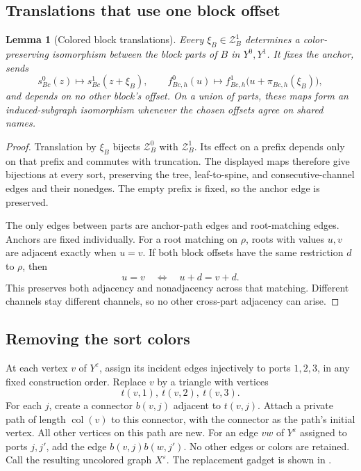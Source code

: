 \documentclass[11pt]{article}
\newtheorem{lemma}[theorem]{Lemma}
\theoremstyle{definition}
\begin{document}
\subsection{Translations that use one block offset}

\begin{lemma}[Colored block translations]
\label{graph:colored-translations}
Every \(\xi_B\in\mathcal Z_B^1\) determines a color-preserving isomorphism
between the block parts of \(B\) in \(Y^0,Y^1\).
It fixes the anchor, sends
\[
 s_{Bc}^0(z)\longmapsto s_{Bc}^1(z+\xi_B),
 \qquad
 f_{Bc,h}^0(u)\longmapsto
 f_{Bc,h}^1\bigl(u+\pi_{Bc,h}(\xi_B)\bigr),
\]
and depends on no other block's offset.
On a union of parts, these maps form an induced-subgraph
isomorphism whenever the chosen offsets agree on shared names.
\end{lemma}

\begin{proof}
Translation by \(\xi_B\) bijects \(\mathcal Z_B^0\) with \(\mathcal Z_B^1\).
Its effect on a prefix depends only on that prefix and commutes with
truncation.  The displayed maps therefore give bijections at every
sort, preserving the tree, leaf-to-spine, and consecutive-channel
edges and their nonedges.
The empty prefix is fixed, so the anchor edge is preserved.

The only edges between parts are anchor-path edges and root-matching
edges.  Anchors are fixed individually.
For a root matching on \(\rho\), roots with values \(u,v\) are
adjacent exactly when \(u=v\).
If both block offsets have the same restriction \(d\) to \(\rho\),
then
\[
                       u=v\quad\Longleftrightarrow\quad u+d=v+d.
\]
This preserves both adjacency and nonadjacency across that matching.
Different channels stay different channels, so no other cross-part
adjacency can arise.
\end{proof}

\subsection{Removing the sort colors}

At each vertex \(v\) of \(Y^\varepsilon\), assign its incident edges injectively
to ports \(1,2,3\), in any fixed construction order.
Replace \(v\) by a triangle with vertices
\[
                       t(v,1),\ t(v,2),\ t(v,3).
\]
For each \(j\), create a connector \(b(v,j)\) adjacent to \(t(v,j)\).
Attach a private path of length \(\operatorname{col}(v)\) to this
connector, with the connector as the path's initial vertex.
All other vertices on this path are new.
For an edge \(vw\) of \(Y^\varepsilon\) assigned to ports \(j,j'\), add the
edge \(b(v,j)b(w,j')\).
No other edges or colors are retained.
Call the resulting uncolored graph \(X^\varepsilon\).
The replacement gadget is shown in .
\end{document}
